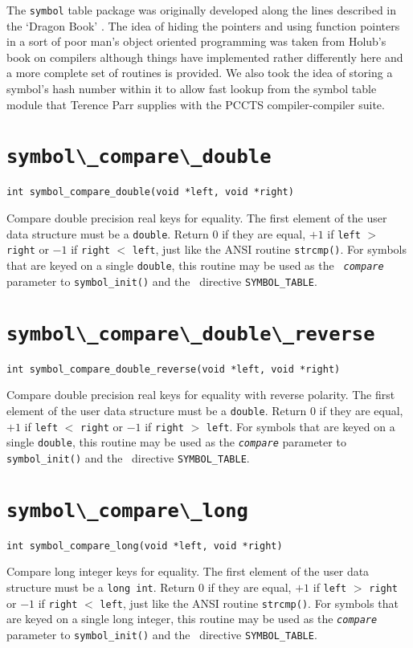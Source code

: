 The {\tt symbol} table package was originally developed along the lines
described in the `Dragon Book' \cite{dragon}. The idea of hiding the
pointers and using function pointers in a sort of poor man's object
oriented programming was taken from Holub's book on compilers
\cite{holub} although things have implemented rather differently here and
a more complete set of routines is provided. We also took the idea of
storing a symbol's hash number within it to allow fast lookup from the
symbol table module that Terence Parr supplies with the PCCTS
\cite{PARR95} compiler-compiler suite.


\section{\protect\verb+symbol\_compare\_double+}
\begin{verbatim}
int symbol_compare_double(void *left, void *right)
\end{verbatim}
Compare double precision real keys for equality. The first element of
the user data structure must be a {\tt double}. Return 0 if they are
equal, $+1$ if {\tt left} $>$ {\tt right} or $-1$ if {\tt right} $<$
{\tt left}, just like the ANSI routine {\tt strcmp()}. For symbols that
are keyed on a single {\tt double}, this routine may be used as the {\tt\em
compare} parameter to \verb+symbol_init()+ and the \rdp\ directive
\verb+SYMBOL_TABLE+.

\section{\protect\verb+symbol\_compare\_double\_reverse+}
\begin{verbatim}
int symbol_compare_double_reverse(void *left, void *right)
\end{verbatim}
Compare double precision real keys for equality with reverse polarity.
The first element of the user data structure must be a {\tt double}.
Return 0 if they are equal, $+1$ if {\tt left} $<$ {\tt right} or $-1$
if {\tt right} $>$ {\tt left}. For symbols that are keyed on a single
{\tt double}, this routine may be used as the {\tt\em compare} parameter to
\verb+symbol_init()+ and the \rdp\ directive \verb+SYMBOL_TABLE+.

\section{\protect\verb+symbol\_compare\_long+}
\begin{verbatim}
int symbol_compare_long(void *left, void *right)
\end{verbatim}
Compare long integer keys for equality. The first element of the user data
structure must be a {\tt long int}. Return 0 if they are equal, $+1$ if
{\tt left} $>$ {\tt right} or $-1$ if {\tt right} $<$ {\tt left}, just
like the ANSI routine {\tt strcmp()}. For symbols that are keyed on a
single long integer, this routine may be used as the {\tt\em compare}
parameter to \verb+symbol_init()+ and the \rdp\ directive \verb+SYMBOL_TABLE+.

